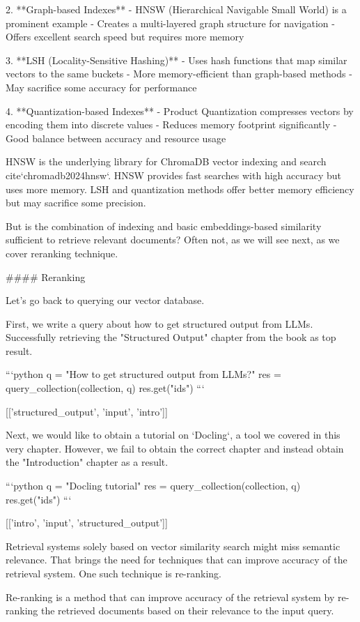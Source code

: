 {{2. **Graph-based Indexes**
   - HNSW (Hierarchical Navigable Small World) is a prominent example
   - Creates a multi-layered graph structure for navigation
   - Offers excellent search speed but requires more memory

3. **LSH (Locality-Sensitive Hashing)**
   - Uses hash functions that map similar vectors to the same buckets
   - More memory-efficient than graph-based methods
   - May sacrifice some accuracy for performance

4. **Quantization-based Indexes**
   - Product Quantization compresses vectors by encoding them into discrete values
   - Reduces memory footprint significantly
   - Good balance between accuracy and resource usage

HNSW is the underlying library for ChromaDB vector indexing and search {cite}`chromadb2024hnsw`. HNSW provides fast searches with high accuracy but uses more memory. LSH and quantization methods offer better memory efficiency but may sacrifice some precision.

But is the combination of indexing and basic embeddings-based similarity sufficient to retrieve relevant documents? Often not, as we will see next, as we cover reranking technique.

#### Reranking

Let's go back to querying our vector database.

First, we write a query about how to get structured output from LLMs. Successfully retrieving the "Structured Output" chapter from the book as top result.


```python
q = "How to get structured output from LLMs?"
res = query_collection(collection, q)
res.get("ids")
```

    [['structured_output', 'input', 'intro']]


Next, we would like to obtain a tutorial on `Docling`, a tool we covered in this very chapter. However, we fail to obtain the correct chapter and instead obtain the "Introduction" chapter as a result.


```python
q = "Docling tutorial"
res = query_collection(collection, q)
res.get("ids")
```

    [['intro', 'input', 'structured_output']]


Retrieval systems solely based on vector similarity search might miss semantic relevance. That brings the need for techniques that can improve accuracy of the retrieval system. One such technique is re-ranking.

Re-ranking is a method that can improve accuracy of the retrieval system by re-ranking the retrieved documents based on their relevance to the input query.

}}
